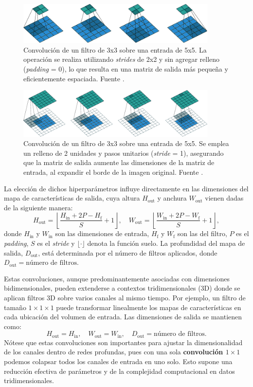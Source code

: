 \begin{figure}[H]
	\centering
	\includegraphics[width=100mm]{img/stride.png}
	\caption{Convolución de un filtro de 3x3 sobre una entrada de 5x5. La operación se realiza utilizando \textit{strides} de 2x2 y sin agregar relleno (\textit{padding} = 0), lo que resulta en una matriz de salida más pequeña y eficientemente espaciada. Fuente \cite{Dumoulin2016AGT}.}
\end{figure}
\begin{figure}[H]
	\centering
	\includegraphics[width=100mm]{img/padding.png}
	\caption{Convolución de un filtro de 3x3 sobre una entrada de 5x5. Se emplea un relleno de 2 unidades y pasos unitarios (\textit{stride} = 1), asegurando que la matriz de salida aumente las dimensiones de la matriz de entrada, al expandir el borde de la imagen original. Fuente \cite{Dumoulin2016AGT}.}
\end{figure}

La elección de dichos hiperparámetros influye directamente en las dimensiones del mapa de características de salida, cuya altura \(H_{\text{out}}\) y anchura \(W_{\text{out}}\) vienen dadas de la siguiente manera:
\[
H_{\text{out}} = \left\lfloor \frac{H_{\text{in}} + 2P - H_{\text{f}}}{S} + 1 \right\rfloor, \quad
W_{\text{out}} = \left\lfloor \frac{W_{\text{in}} + 2P - W_{\text{f}}}{S} + 1 \right\rfloor,
\]
donde \(H_{\text{in}}\) y \(W_{\text{in}}\) son las dimensiones de entrada, \(H_{\text{f}}\) y \(W_{\text{f}}\) son las del filtro, \(P\) es el \textit{padding}, \(S\) es el \textit{stride} y $\lfloor \cdot \rfloor$ denota la función suelo. La profundidad del mapa de salida, \(D_{\text{out}}\), está determinada por el número de filtros aplicados, donde \( D_{\text{out}} = \text{número de filtros} \).

Estas convoluciones, aunque predominantemente asociadas con dimensiones bidimensionales, pueden extenderse a contextos tridimensionales (3D) donde se aplican filtros 3D sobre varios canales al mismo tiempo. Por ejemplo, un filtro de tamaño $1 \times 1 \times 1$ puede transformar linealmente los mapas de características en cada ubicación del volumen de entrada. Las dimensiones de salida se mantienen como:
\[
H_{\text{out}} = H_{\text{in}}, \quad W_{\text{out}} = W_{\text{in}}, \quad D_{\text{out}} = \text{número de filtros}.
\]
Nótese que estas convoluciones son importantes para ajustar la dimensionalidad de los canales dentro de redes profundas, pues con una sola \textbf{convolución $1 \times 1$} podemos colapsar todos los canales de entrada en uno solo. Esto supone una reducción efectiva de parámetros y de la complejidad computacional en datos tridimensionales.

